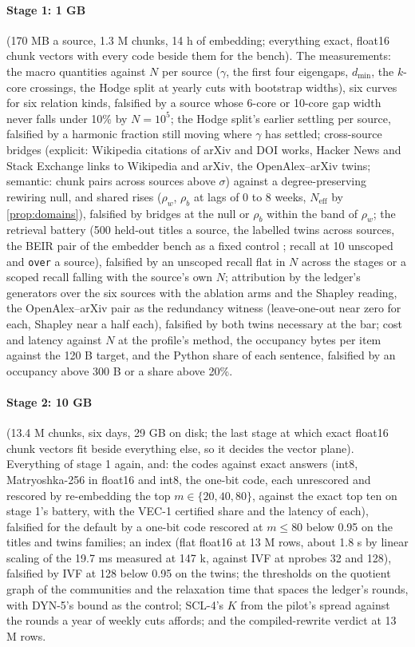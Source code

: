 \documentclass[11pt]{article}
\theoremstyle{plain}
\theoremstyle{definition}
\theoremstyle{remark}
\newcommand{\code}[1]{\texttt{#1}}
\newcommand{\Neff}{N_{\mathrm{eff}}}
\begin{document}
\paragraph{Stage 1: 1 GB} (170 MB a source, 1.3 M chunks, 14 h of embedding; everything exact,
float16 chunk vectors with every code beside them for the bench). The measurements: the macro
quantities against $N$ per source ($\gamma$, the first four eigengaps, $d_{\min}$, the $k$-core
crossings, the Hodge split at yearly cuts with bootstrap widths), six curves for six relation
kinds, falsified by a source whose 6-core or 10-core gap width never falls under 10\% by $N=10^5$;
the Hodge split's earlier settling per source, falsified by a harmonic fraction still moving where
$\gamma$ has settled; cross-source bridges (explicit: Wikipedia citations of arXiv and DOI works,
Hacker News and Stack Exchange links to Wikipedia and arXiv, the OpenAlex–arXiv twins; semantic:
chunk pairs across sources above $\sigma$) against a degree-preserving rewiring null, and shared
rises ($\rho_w$, $\rho_b$ at lags of 0 to 8 weeks, $\Neff$ by \cref{prop:domains}), falsified by
bridges at the null or $\rho_b$ within the band of $\rho_w$; the retrieval battery (500 held-out
titles a source, the labelled twins across sources, the BEIR pair of the embedder bench as a fixed
control \citep{thakur2021beir}; recall at 10 unscoped and \code{over} a source), falsified by an
unscoped recall flat in $N$ across the stages or a scoped recall falling with the source's own $N$;
attribution by the ledger's generators over the six sources with the ablation arms and the
Shapley reading, the OpenAlex–arXiv pair as the redundancy witness (leave-one-out near zero for
each, Shapley near a half each), falsified by both twins necessary at the bar; cost and latency
against $N$ at the profile's method, the occupancy bytes per item against the 120 B target, and
the Python share of each sentence, falsified by an occupancy above 300 B or a share above 20\%.

\paragraph{Stage 2: 10 GB} (13.4 M chunks, six days, 29 GB on disk; the last stage at which exact
float16 chunk vectors fit beside everything else, so it decides the vector plane). Everything of
stage 1 again, and: the codes against exact answers (int8, Matryoshka-256 in float16 and int8, the
one-bit code, each unrescored and rescored by re-embedding the top $m\in\{20,40,80\}$, against the
exact top ten on stage 1's battery, with the VEC-1 certified share and the latency of each),
falsified for the default by a one-bit code rescored at $m\le80$ below 0.95 on the titles and twins
families; an index (flat float16 at 13 M rows, about 1.8 s by linear scaling of the 19.7 ms measured
at 147 k, against IVF at nprobes 32 and 128), falsified by IVF at 128 below 0.95 on the twins; the
thresholds on the quotient graph of the communities and the relaxation time that spaces the
ledger's rounds, with DYN-5's bound as the control; SCL-4's $K$ from the pilot's spread against
the rounds a year of weekly cuts affords; and the compiled-rewrite verdict at 13 M rows.
\end{document}
